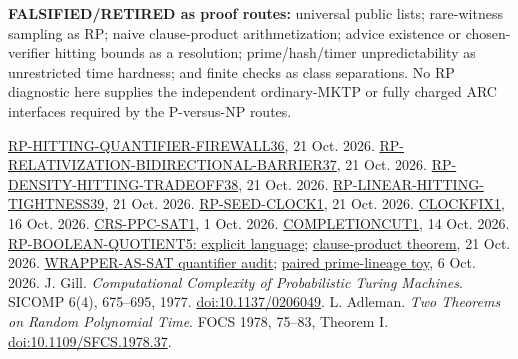 \documentclass[11pt]{article}
\newcommand{\repo}[2]{\href{https://github.com/j15marti/pnp/blob/b3ea46290587fcaea559552ed899f942f956b327/#1}{#2}}
\begin{document}
\textbf{FALSIFIED/RETIRED as proof routes:} universal public lists;
rare-witness sampling as RP; naive clause-product arithmetization; advice
existence or chosen-verifier hitting bounds as a resolution; prime/hash/timer
unpredictability as unrestricted time hardness; and finite checks as class
separations. No RP diagnostic here supplies the independent ordinary-MKTP or
fully charged ARC interfaces required by the P-versus-NP routes.

\vspace{-.5em}
\begin{thebibliography}{99}\small\setlength{\itemsep}{1pt}\setlength{\parskip}{0pt}
\repo{research/main/2026-10-21_0848_MAIN_RP_HITTING_QUANTIFIER_FIREWALL36.tex}{RP-HITTING-QUANTIFIER-FIREWALL36}, 21 Oct. 2026.
\repo{research/main/2026-10-21_0948_MAIN_RP_RELATIVIZATION_BIDIRECTIONAL_BARRIER37.tex}{RP-RELATIVIZATION-BIDIRECTIONAL-BARRIER37}, 21 Oct. 2026.
\repo{research/main/2026-10-21_1048_MAIN_RP_DENSITY_HITTING_TRADEOFF38.md}{RP-DENSITY-HITTING-TRADEOFF38}, 21 Oct. 2026.
\repo{research/main/2026-10-21_1148_MAIN_RP_LINEAR_HITTING_TIGHTNESS39.md}{RP-LINEAR-HITTING-TIGHTNESS39}, 21 Oct. 2026.
\repo{research/review/outbox/rp-separation/2026-10-21_0812_RP_SEED_CLOCK1_status.md}{RP-SEED-CLOCK1}, 21 Oct. 2026.
\repo{research/agents/lspv-1/2026-10-16_1812Z_LSPV-1_CLOCKFIX1.md}{CLOCKFIX1}, 16 Oct. 2026.
\repo{research/explorations/random-challenge/2026-10-01_CRS-PPC-SAT1.md}{CRS-PPC-SAT1}, 1 Oct. 2026.
\repo{research/agents/lspv-4/2026-10-14_0717_LSPV-4_COMPLETIONCUT1.tex}{COMPLETIONCUT1}, 14 Oct. 2026.
\repo{research/review/outbox/rp-separation/2026-10-21_1112_RP_BOOLEAN_QUOTIENT5_RP_language.md}{RP-BOOLEAN-QUOTIENT5: explicit language}; \repo{research/review/outbox/rp-separation/2026-10-21_1112_RP_BOOLEAN_QUOTIENT5_theorem.md}{clause-product theorem}, 21 Oct. 2026.
\repo{research/agents/lead/2026-10-06_1436_LEAD-0023_WRAPPER_AS_SAT_QUANTIFIER_AUDIT.md}{WRAPPER-AS-SAT quantifier audit}; \repo{research/agents/lead/2026-10-06_1456_LEAD-0024_WRAPPER_AS_SAT_PRIME_LINEAGE_TOY.md}{paired prime-lineage toy}, 6 Oct. 2026.
J. Gill. \emph{Computational Complexity of Probabilistic Turing Machines}. SICOMP 6(4), 675--695, 1977. \href{https://doi.org/10.1137/0206049}{doi:10.1137/0206049}.
L. Adleman. \emph{Two Theorems on Random Polynomial Time}. FOCS 1978, 75--83, Theorem I. \href{https://doi.org/10.1109/SFCS.1978.37}{doi:10.1109/SFCS.1978.37}.

\end{thebibliography}
\end{document}
